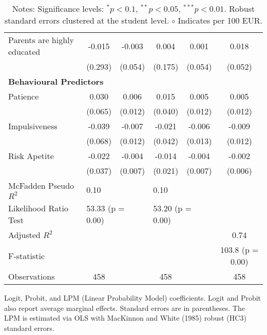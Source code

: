 \begin{table}
\begin{tabular}{lccccc}
Parents are highly educated & -0.015 & -0.003 & 0.004 & 0.001 & 0.018 \\
 & (0.293) & (0.054) & (0.175) & (0.054) & (0.052) \\
\midrule
\multicolumn{6}{l}{\textbf{Behavioural Predictors}} \\
Patience & 0.030 & 0.006 & 0.015 & 0.005 & 0.005 \\
 & (0.065) & (0.012) & (0.040) & (0.012) & (0.012) \\
Impulsiveness & -0.039 & -0.007 & -0.021 & -0.006 & -0.009 \\
 & (0.068) & (0.012) & (0.042) & (0.013) & (0.012) \\
Risk Apetite & -0.022 & -0.004 & -0.014 & -0.004 & -0.002 \\
 & (0.037) & (0.007) & (0.021) & (0.007) & (0.006) \\
\midrule
McFadden Pseudo $R^2$ & \multicolumn{2}{l}{0.10} & \multicolumn{2}{l}{0.10} & \\
Likelihood Ratio Test & \multicolumn{2}{l}{53.33 (p = 0.00)} & \multicolumn{2}{l}{53.20 (p = 0.00)} & \\
Adjusted $R^2$ & & & & & 0.74 \\
F-statistic & & & & & 103.8 (p = 0.00) \\
Observations & 458 & & 458 && 458 \\
\bottomrule
\end{tabular}
\caption{\small{Logit, Probit, and LPM (Linear Probability Model) coefficients. Logit and Probit also report average marginal effects. Standard errors are in parentheses. The LPM is estimated via OLS with MacKinnon and White (1985) robust (HC3) standard errors.}}
\label{tab:logit_probit_lpm_results}
\caption*{\footnotesize{Notes: Significance levels: $^{{*}} p < 0.1$, $^{{**}} p < 0.05$, $^{{***}} p < 0.01$. Robust standard errors clustered at the student level. $\circ$ Indicates per 100 EUR.}}
\end{table}
